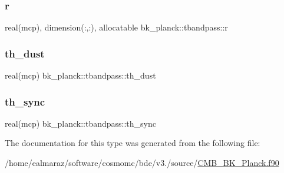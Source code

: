 \subsubsection{\texorpdfstring{r}{r}}
{\footnotesize\ttfamily real(mcp), dimension(\+:,\+:), allocatable bk\+\_\+planck\+::tbandpass\+::r\hspace{0.3cm}{\ttfamily [private]}}

\mbox{\label{structbk__planck_1_1tbandpass_a7cc24a267d7fe8a1d4856787a8550672}} 
\subsubsection{\texorpdfstring{th\+\_\+dust}{th\_dust}}
{\footnotesize\ttfamily real(mcp) bk\+\_\+planck\+::tbandpass\+::th\+\_\+dust\hspace{0.3cm}{\ttfamily [private]}}

\mbox{\label{structbk__planck_1_1tbandpass_a5a346e056ff41d917a1dba59fde3a2a5}} 
\subsubsection{\texorpdfstring{th\+\_\+sync}{th\_sync}}
{\footnotesize\ttfamily real(mcp) bk\+\_\+planck\+::tbandpass\+::th\+\_\+sync\hspace{0.3cm}{\ttfamily [private]}}



The documentation for this type was generated from the following file\+:\begin{DoxyCompactItemize}
\item 
/home/ealmaraz/software/cosmomc/bde/v3./source/\mbox{\hyperlink{CMB__BK__Planck_8f90}{C\+M\+B\+\_\+\+B\+K\+\_\+\+Planck.\+f90}}\end{DoxyCompactItemize}
